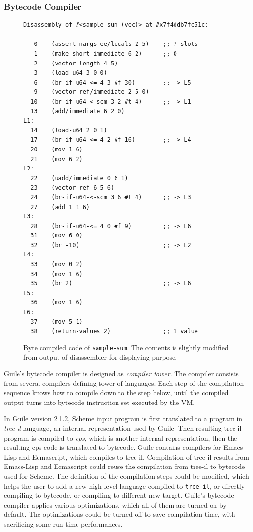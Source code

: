 \documentclass[preprint, 10pt]{sigplanconf}
\begin{document}
\subsubsection{Bytecode Compiler}

\begin{figure}
  \begin{center}
    \small
\begin{verbatim}
Disassembly of #<sample-sum (vec)> at #x7f4ddb7fc51c:

   0    (assert-nargs-ee/locals 2 5)    ;; 7 slots
   1    (make-short-immediate 6 2)      ;; 0
   2    (vector-length 4 5)
   3    (load-u64 3 0 0)
   6    (br-if-u64-<= 4 3 #f 30)        ;; -> L5
   9    (vector-ref/immediate 2 5 0)
  10    (br-if-u64-<-scm 3 2 #t 4)      ;; -> L1
  13    (add/immediate 6 2 0)
L1:
  14    (load-u64 2 0 1)
  17    (br-if-u64-<= 4 2 #f 16)        ;; -> L4
  20    (mov 1 6)
  21    (mov 6 2)
L2:
  22    (uadd/immediate 0 6 1)
  23    (vector-ref 6 5 6)
  24    (br-if-u64-<-scm 3 6 #t 4)      ;; -> L3
  27    (add 1 1 6)
L3:
  28    (br-if-u64-<= 4 0 #f 9)         ;; -> L6
  31    (mov 6 0)
  32    (br -10)                        ;; -> L2
L4:
  33    (mov 0 2)
  34    (mov 1 6)
  35    (br 2)                          ;; -> L6
L5:
  36    (mov 1 6)
L6:
  37    (mov 5 1)
  38    (return-values 2)               ;; 1 value
\end{verbatim}
\end{center}
\caption{Byte compiled code of \texttt{sample-sum}. The contents is slightly
  modified from output of disassembler for displaying purpose.}
\label{fig:bytecode}
\end{figure}

Guile's bytecode compiler is designed as \textit{compiler tower}. The compiler
consists from several compilers defining tower of languages. Each step of the
compilation sequence knows how to compile down to the step below, until the
compiled output turns into bytecode instruction set executed by the VM.\@

In Guile version 2.1.2, Scheme input program is first translated to a program in
\textit{tree-il} language, an internal representation used by Guile. Then
resulting tree-il program is compiled to \textit{cps}, which is another internal
representation, then the resulting cps code is translated to bytecode. Guile
contains compilers for Emacs-Lisp and Ecmascript, which compiles to
tree-il. Compilation of tree-il results from Emacs-Lisp and Ecmascript could
reuse the compilation from tree-il to bytecode used for Scheme. The definition
of the compilation steps could be modified, which helps the user to add a new
high-level language compiled to \texttt{tree-il}, or directly compiling to
bytecode, or compiling to different new target. Guile's bytecode compiler
applies various optimizations, which all of them are turned on by default. The
optimizations could be turned off to save compilation time, with sacrificing
some run time performances.
\end{document}
